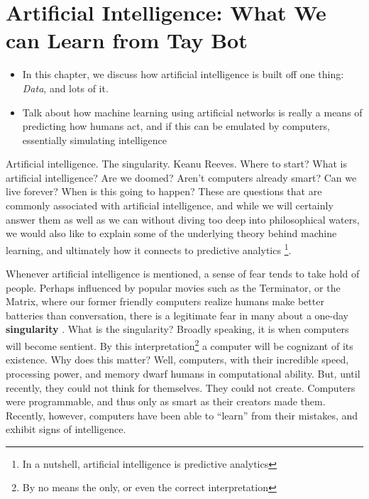 \documentclass[../../fulltext/fulltext.tex]{subfiles}
\begin{document}
\chapter[Rise of the Bots]{Artificial Intelligence: What We can Learn from Tay Bot}
\begin{itemize}
	\item In this chapter, we discuss how artificial intelligence is built off one thing: \emph{Data}, and lots of it.
	\item Talk about how machine learning using artificial networks is really a means of predicting how humans act, and if this can be emulated by computers, essentially simulating intelligence
\end{itemize}
Artificial intelligence.  The singularity.  Keanu Reeves.  Where to start?  What is artificial intelligence?  Are we doomed?  Aren't computers already smart?  Can we live forever?  When is this going to happen? These are questions that are commonly associated with artificial intelligence, and while we will certainly answer them as well as we can without diving too deep into philosophical waters, we would also like to explain some of the underlying theory behind machine learning, and ultimately how it connects to predictive analytics \footnote{In a nutshell, artificial intelligence is predictive analytics}.  

Whenever artificial intelligence is mentioned, a sense of fear tends to take hold of people.  Perhaps influenced by popular movies such as the Terminator, or the Matrix, where our former friendly computers realize humans make better batteries than conversation, there is a legitimate fear in many about a one-day \textbf{singularity} . What is the singularity?  Broadly speaking, it is when computers will become sentient.  By this interpretation\footnote{By no means the only, or even the correct interpretation}  a computer will be cognizant of its existence.  Why does this matter?  Well, computers, with their incredible speed, processing power, and memory dwarf humans in computational ability.  But, until recently, they could not think for themselves.  They could not create.  Computers were programmable, and thus only as smart as their creators made them.  Recently, however, computers have been able to ``learn'' from their mistakes, and exhibit signs of intelligence. 
\end{document}
